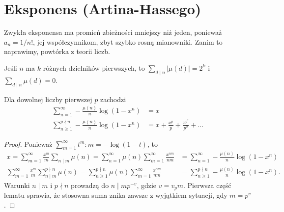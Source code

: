 \section{Eksponens (Artina-Hassego)}
Zwykła  eksponensa ma promień zbieżności mniejszy niż jeden, ponieważ $a_n = 1/n!$, jej współczynnikom, zbyt  szybko rosną mianowniki.
Zanim to naprawimy, powtórka z teorii liczb.

\begin{lemat}
	Jeśli $n$ ma $k$ różnych dzielników pierwszych, to $\sum_{d \mid n} |\mu(d)| = 2^k$ i $\sum_{d \mid n} \mu (d) = 0$.
\end{lemat}

\begin{fakt}
	Dla dowolnej liczby pierwszej $p$ zachodzi
	\begin{align*}
		\sum_{n=1}^\infty - \frac{\mu(n)}{n} \log(1-x^n) & = x \\
		\sum_{n \ge 1}^{p \nmid n}  - \frac{\mu(n)}{n} \log(1-x^n) & = x + \frac{x^p}{p} + \frac{x^{p^2}}{p^2} + \dots
	\end{align*}
\end{fakt}
	
\begin{proof}
	Ponieważ $\sum_{m=1}^\infty t^m : m = -\log(1-t)$, to
	\begin{align*}
		x = \sum_{m = 1}^\infty \frac{x^m}{m} \sum_{n \mid m} \mu (n) = \sum_{n = 1}^\infty \mu(n) \sum_{m=1}^\infty \frac{x^{nm}}{nm} & = \sum_{n = 1}^\infty - \frac{\mu(n)}{n} \log(1-x^n)\\
		\sum_{m = 1}^\infty \frac{x^m}{m} \sum_{n \mid m}^{p \nmid n} \mu (n) = \sum_{n\ge 1}^{p \nmid n} \mu(n) \sum_{m=1}^\infty \frac{x^{nm}}{nm} & = \sum_{n \ge 1}^{p \nmid n} - \frac{\mu(n)}{n} \log(1-x^n).
	\end{align*}
	Warunki $n \mid m$ i $p \nmid n$ prowadzą do $n \mid mp^{-v}$, gdzie $v = v_pm$.
	Pierwsza część lematu sprawia, że stosowna suma znika zawsze z wyjątkiem sytuacji, gdy $m = p^v$.
\end{proof}


